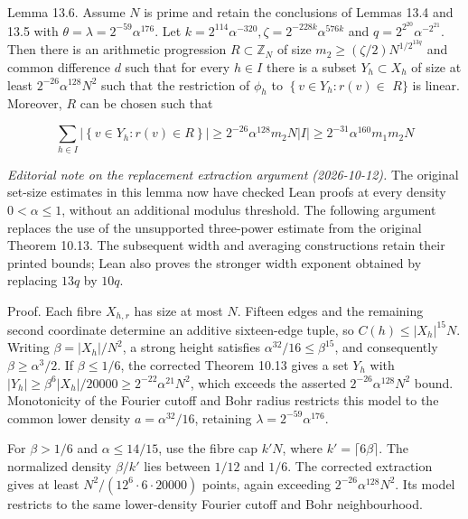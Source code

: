 \documentclass[10pt]{article}
\begin{document}
Lemma 13.6. Assume $N$ is prime and retain the conclusions of Lemmas 13.4 and 13.5 with $\theta=\lambda=2^{-59}\alpha^{176}$. Let $k=2^{114} \alpha^{-320}, \zeta=2^{-228 k} \alpha^{576 k}$ and $q=2^{2^{20}} \alpha^{-2^{21}}$. Then there is an arithmetic progression $R \subset \mathbb{Z}_{N}$ of size $m_{2} \geqslant(\zeta / 2) N^{1 / 2^{13 q}}$ and common difference $d$ such that for every $h \in I$ there is a subset $Y_{h} \subset X_{h}$ of size at least $2^{-26} \alpha^{128} N^{2}$ such that the restriction of $\phi_{h}$ to $\left\{v \in Y_{h}: r(v) \in\right.$ $R\}$ is linear. Moreover, $R$ can be chosen such that

$$
\sum_{h \in I}\left|\left\{v \in Y_{h}: r(v) \in R\right\}\right| \geqslant 2^{-26} \alpha^{128} m_{2} N|I| \geqslant 2^{-31} \alpha^{160} m_{1} m_{2} N
$$

\emph{Editorial note on the replacement extraction argument (2026-10-12).}
The original set-size estimates in this lemma now have checked Lean proofs
at every density $0<\alpha\leqslant1$, without an additional modulus threshold.
The following argument replaces the use of the unsupported three-power
estimate from the original Theorem 10.13. The subsequent width and averaging
constructions retain their printed bounds; Lean also proves the stronger
width exponent obtained by replacing $13q$ by $10q$.

Proof. Each fibre $X_{h,r}$ has size at most $N$. Fifteen edges and the
remaining second coordinate determine an additive sixteen-edge tuple, so
$C(h)\leqslant|X_h|^{15}N$. Writing $\beta=|X_h|/N^2$, a strong height satisfies
$\alpha^{32}/16\leqslant\beta^{15}$, and consequently $\beta\geqslant\alpha^3/2$.
If $\beta\leqslant1/6$, the corrected Theorem 10.13 gives a set $Y_h$ with
$|Y_h|\geqslant\beta^6|X_h|/20000\geqslant2^{-22}\alpha^{21}N^2$, which exceeds
the asserted $2^{-26}\alpha^{128}N^2$ bound. Monotonicity of the Fourier cutoff
and Bohr radius restricts this model to the common lower density
$a=\alpha^{32}/16$, retaining $\lambda=2^{-59}\alpha^{176}$.

For $\beta>1/6$ and $\alpha\leqslant14/15$, use the fibre cap $k'N$, where
$k'=\lceil6\beta\rceil$. The normalized density $\beta/k'$ lies between $1/12$
and $1/6$. The corrected extraction gives at least
$N^2/(12^6\cdot6\cdot20000)$ points, again exceeding
$2^{-26}\alpha^{128}N^2$. Its model restricts to the same lower-density
Fourier cutoff and Bohr neighbourhood.
\end{document}
